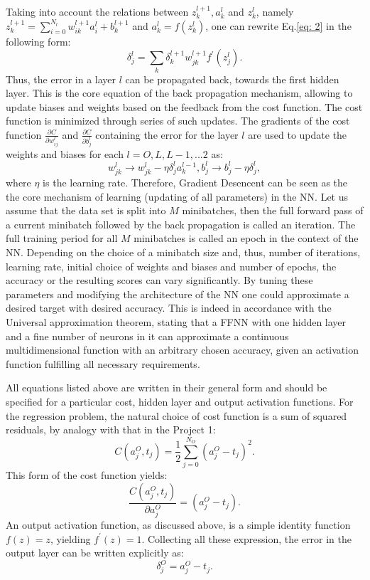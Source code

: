 \documentclass{emulateapj}
\begin{document}
Taking into account the relations between $z_{k}^{l+1}, a_{k}^{l}$ and $z_{k}^{l}$, namely  $z_{k}^{l+1}=\sum_{i=0}^{N_l}w_{ik}^{l+1}a_i^l+b^{l+1}_k$ and $a_{k}^{l}=f(z_{k}^{l})$, one can rewrite Eq.\ref{eq: 2} in the following form:
\begin{equation}
    \delta_j^l=\sum_k \delta_k^{l+1} w_{jk}^{l+1}f^{\prime}(z_j^l).
\end{equation}
Thus, the error in a layer $l$ can be propagated back, towards the first hidden layer. This is the core equation of the back propagation mechanism, allowing to update biases and weights based on the feedback from the cost function. The cost function is minimized through series of such updates. The gradients of the cost function $\frac{\partial C}{\partial w_{ij}^l}$ and $\frac{\partial C}{\partial b_{j}^l}$ containing the error for the layer $l$ are used to update the weights and biases for each $l=O, L, L-1, ...2$ as:
\begin{equation}
    w^l_{jk}\rightarrow w_{jk}^l-\eta\delta_j^la_k^{l-1},
    b_j^l\rightarrow b_j^l-\eta\delta_j^l,
\end{equation}
where $\eta$ is the learning rate. Therefore,  Gradient Desencent can be seen as the the core mechanism of learning (updating of all parameters) in the NN. Let us assume that the data set is split into $M$
minibatches, then the full forward pass of a current minibatch followed by the back propagation is called an iteration. The full training period for all $M$ minibatches is called an epoch in the context of the NN. Depending on the choice of a minibatch size and, thus, number of iterations, learning rate, initial choice of weights and biases and number of epochs, the accuracy or the resulting scores can vary significantly. By tuning these parameters and modifying the architecture of the NN one could approximate a desired target with desired accuracy. This is indeed in accordance with the Universal approximation theorem, stating that a FFNN with one hidden layer and a fine number of neurons in it can approximate a continuous multidimensional function with an arbitrary chosen accuracy, given an activation function fulfilling all necessary requirements. 

All equations listed above are written in their general form and should be specified for a particular cost, hidden layer and output activation functions. For the regression problem, the natural choice of cost function is a sum of squared residuals, by analogy with that in the Project 1:
\begin{equation}
    C(a_j^O, t_j)=\frac{1}{2}\sum_{j=0}^{N_O}(a_j^O-t_j)^2.
\end{equation}
 This form of the cost function yields:
 \begin{equation}
     \frac{C(a_j^O, t_j)}{\partial a_{j}^O}=(a_{j}^O-t_j).
 \end{equation}
 An output activation function, as discussed above, is a simple identity function $f(z)=z$, yielding $f^{\prime}(z)=1$. Collecting all these expression, the error in the output layer can be written explicitly as:
 \begin{equation}
     \delta_j^O = a_{j}^O-t_j.
 \end{equation}
 
\end{document}
